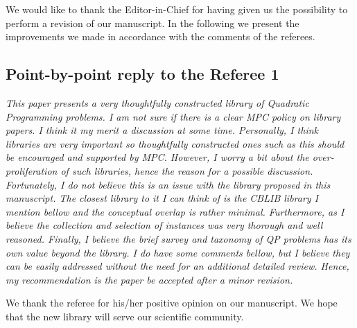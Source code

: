 \documentclass[11pt]{article}
\newcommand{\rep}[1]{{\textcolor{acblue}{#1}}}
\begin{document}
\rep{We would like to thank the Editor-in-Chief for having given us the possibility to perform a revision of our manuscript. In the following we present the improvements we made in accordance with the comments of the referees. }




\subsection*{Point-by-point reply to the Referee 1}

{\it
This paper presents a very thoughtfully constructed library of Quadratic Programming problems. I am not sure if there is a clear MPC policy on library
papers. I think it my merit a discussion at some time. Personally, I think libraries are very important so thoughtfully constructed ones such as this should
be encouraged and supported by MPC. However, I worry a bit about the over-
proliferation of such libraries, hence the reason for a possible discussion. Fortunately, I do not believe this is an issue with the library proposed in this
manuscript. The closest library to it I can think of is the CBLIB library I
mention bellow and the conceptual overlap is rather minimal. Furthermore, as
I believe the collection and selection of instances was very thorough and well
reasoned. Finally, I believe the brief survey and taxonomy of QP problems has
its own value beyond the library. I do have some comments bellow, but I believe
they can be easily addressed without the need for an additional detailed review.
Hence, my recommendation is the paper be accepted after a minor revision.
}

\rep{We thank the referee for his/her positive opinion on our manuscript. We hope that the new library will serve our scientific community.}
\end{document}
